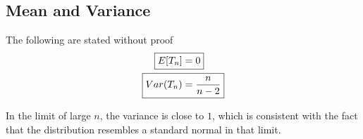 \documentclass[../probability-notes.tex]{subfiles}
\begin{document}
    \subsection{Mean and Variance}
    The following are stated without proof
    \begin{align*}
        \Aboxed{E[T_{n}] &= 0}\\
        \Aboxed{Var(T_{n}) &= \frac{n}{n-2}}\\
    \end{align*}

    In the limit of large $n$, the variance is close to $1$, which is consistent with the fact that the distribution resembles a standard normal in that limit.
\end{document}
